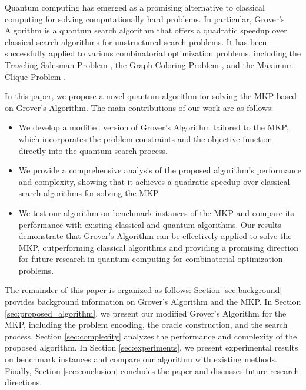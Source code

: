 Quantum computing has emerged as a promising alternative to classical computing for solving computationally hard problems. In particular, Grover's Algorithm \cite{grover1996} is a quantum search algorithm that offers a quadratic speedup over classical search algorithms for unstructured search problems. It has been successfully applied to various combinatorial optimization problems, including the Traveling Salesman Problem \cite{tsp_grover}, the Graph Coloring Problem \cite{graph_coloring_grover}, and the Maximum Clique Problem \cite{clique_grover}.

In this paper, we propose a novel quantum algorithm for solving the MKP based on Grover's Algorithm. The main contributions of our work are as follows:

\begin{itemize}
    \item We develop a modified version of Grover's Algorithm tailored to the MKP, which incorporates the problem constraints and the objective function directly into the quantum search process.
    
    \item We provide a comprehensive analysis of the proposed algorithm's performance and complexity, showing that it achieves a quadratic speedup over classical search algorithms for solving the MKP.
    
    \item We test our algorithm on benchmark instances of the MKP and compare its performance with existing classical and quantum algorithms. Our results demonstrate that Grover's Algorithm can be effectively applied to solve the MKP, outperforming classical algorithms and providing a promising direction for future research in quantum computing for combinatorial optimization problems.
\end{itemize}

The remainder of this paper is organized as follows: Section \ref{sec:background} provides background information on Grover's Algorithm and the MKP. In Section \ref{sec:proposed_algorithm}, we present our modified Grover's Algorithm for the MKP, including the problem encoding, the oracle construction, and the search process. Section \ref{sec:complexity} analyzes the performance and complexity of the proposed algorithm. In Section \ref{sec:experiments}, we present experimental results on benchmark instances and compare our algorithm with existing methods. Finally, Section \ref{sec:conclusion} concludes the paper and discusses future research directions.

